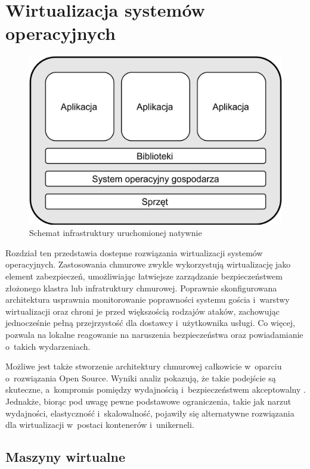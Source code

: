 \chapter{Wirtualizacja systemów operacyjnych}

\begin{figure}[ht]
    \centering
    \includegraphics[width=0.45\linewidth]{images/native.png}
    \caption{Schemat infrastruktury uruchomionej natywnie}
    \label{fig:native}
\end{figure}

Rozdział ten przedstawia dostepne rozwiązania wirtualizacji systemów operacyjnych. Zastosowania chmurowe zwykle wykorzystują wirtualizację jako element zabezpieczeń, umożliwiając łatwiejsze zarządzanie bezpieczeństwem złożonego klastra lub infratruktury chmurowej. Poprawnie skonfigurowana architektura usprawnia monitorowanie poprawności systemu gościa i~warstwy wirtualizacji oraz chroni je przed większością rodzajów ataków, zachowując jednocześnie pełną przejrzystość dla dostawcy i~użytkownika usługi. Co więcej, pozwala na lokalne reagowanie na naruszenia bezpieczeństwa oraz powiadamianie o~takich wydarzeniach.

Możliwe jest także stworzenie architektury chmurowej całkowicie w~oparciu o~rozwiązania Open Source. Wyniki analiz pokazują, że takie podejście są skuteczne, a~kompromis pomiędzy wydajnością i~bezpieczeństwem akceptowalny \cite{LombardiSecureVirtualizationOfCloudComputing}. Jednakże, biorąc pod uwagę pewne podstawowe ograniczenia, takie jak narzut wydajności, elastyczność i~skalowalność, pojawiły się alternatywne rozwiązania dla wirtualizacji w~postaci kontenerów i~unikerneli.

\section{Maszyny wirtualne}

